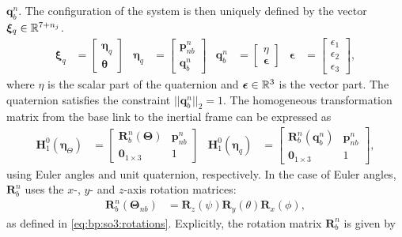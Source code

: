 $\bm{q}_b^n$.
The configuration of the system is then uniquely defined by the vector $\bm{\xi}_q \in \mathbb{R}^{7+n_j}$.
\begin{align}
    \bm{\xi}_q &= \begin{bmatrix}\bm{\eta}_q \\ \bm{\theta} \end{bmatrix} &
        \bm{\eta}_q &= \begin{bmatrix}\bm{p}_{nb}^n \\ \bm{q}_b^n \end{bmatrix} &
            \bm{q}_{b}^n &= \begin{bmatrix}\eta \\ \bm{\epsilon} \end{bmatrix} &
                \bm{\epsilon} &= \begin{bmatrix}\epsilon_1 \\ \epsilon_2 \\ \epsilon_3 \end{bmatrix},
\end{align}
where $\eta$ is the scalar part of the quaternion and $\bm{\epsilon} \in \mathbb{R}^3$ is the vector part.
The quaternion satisfies the constraint $||\bm{q}_b^n||_2 = 1$. The homogeneous
transformation matrix from the base link to the inertial frame can be expressed as
\begin{align}
    \bm{H}_1^0(\bm{\eta}_{\Theta}) &= \begin{bmatrix}
        \bm{R}_b^n(\bm{\Theta})& \bm{p}_{nb}^n \\
        \bm{0}_{1\times3} & 1
    \end{bmatrix} &
    \bm{H}_1^0(\bm{\eta}_{q}) &= \begin{bmatrix}
        \bm{R}_b^n(\bm{q}_{b}^n)& \bm{p}_{nb}^n \\
        \bm{0}_{1\times3} & 1
    \end{bmatrix},
    \label{eq:H1}
\end{align}
using Euler angles and unit quaternion, respectively. In the case of Euler angles,
$\bm{R}_b^n$ uses the $x$-, $y$- and $z$-axis rotation matrices:
\begin{align}
    \bm{R}_b^n(\bm{\Theta}_{nb}) &= \bm{R}_z(\psi) \bm{R}_y(\theta) \bm{R}_x(\phi),
\end{align}
as defined in \autoref{eq:bp:so3:rotations}. Explicitly, the rotation matrix $\bm{R}_b^n$
is given by

